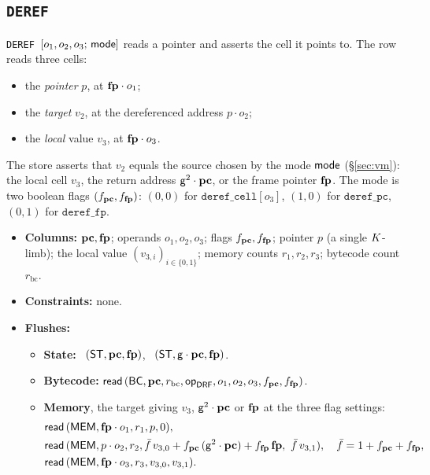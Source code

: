 \subsection{\texttt{DEREF}}\label{sec:tab-deref}

\texttt{DEREF}\ $[o_1,o_2,o_3;\,\mathsf{mode}]$ reads a pointer and asserts the cell it points to. The row reads three cells:
\begin{itemize}
\item the \emph{pointer} $p$, at $\mathbf{fp}\cdot o_1$;
\item the \emph{target} $v_2$, at the dereferenced address $p\cdot o_2$;
\item the \emph{local} value $v_3$, at $\mathbf{fp}\cdot o_3$.
\end{itemize}
The store asserts that $v_2$ equals the source chosen by the mode $\mathsf{mode}$ (\S\ref{sec:vm}): the local cell $v_3$, the return address $\mathsf{g}^{2}\cdot\mathbf{pc}$, or the frame pointer $\mathbf{fp}$. The mode is two boolean flags $(f_{\mathbf{pc}},f_{\mathbf{fp}})$: $(0,0)$ for $\texttt{deref\_cell}[o_3]$, $(1,0)$ for $\texttt{deref\_pc}$, $(0,1)$ for $\texttt{deref\_fp}$.
\begin{itemize}
\item \textbf{Columns:} $\mathbf{pc},\mathbf{fp}$; operands $o_1,o_2,o_3$; flags $f_{\mathbf{pc}},f_{\mathbf{fp}}$; pointer $p$ (a single $K$-limb); the local value $(v_{3,i})_{i\in\{0,1\}}$; memory counts $r_1,r_2,r_3$; bytecode count $r_{\mathrm{bc}}$.
\item \textbf{Constraints:} none.
\item \textbf{Flushes:}
  \begin{itemize}
  \item \textbf{State:} \pull\ $( \mathsf{ST},\mathbf{pc},\mathbf{fp} )$, \push\ $( \mathsf{ST},\mathsf{g}\cdot\mathbf{pc},\mathbf{fp} )$.
  \item \textbf{Bytecode:} $\mathsf{read}\,( \mathsf{BC},\mathbf{pc},r_{\mathrm{bc}},\mathsf{op}_{\mathsf{DRF}},o_1,o_2,o_3,f_{\mathbf{pc}},f_{\mathbf{fp}} )$.
  \item \textbf{Memory}, the target giving $v_3$, $\mathsf{g}^{2}\cdot\mathbf{pc}$ or $\mathbf{fp}$ at the three flag settings:
    \begin{align*}
      &\mathsf{read}\,( \mathsf{MEM},\mathbf{fp}\cdot o_1,r_1,p,0 ),\\
      &\mathsf{read}\,( \mathsf{MEM},p\cdot o_2,r_2,\bar f\,v_{3,0}+f_{\mathbf{pc}}\,(\mathsf{g}^{2}\cdot\mathbf{pc})+f_{\mathbf{fp}}\,\mathbf{fp},\ \bar f\,v_{3,1} ),
      \quad \bar f=1+f_{\mathbf{pc}}+f_{\mathbf{fp}},\\
      &\mathsf{read}\,( \mathsf{MEM},\mathbf{fp}\cdot o_3,r_3,v_{3,0},v_{3,1} ).
    \end{align*}
  \end{itemize}
\end{itemize}

